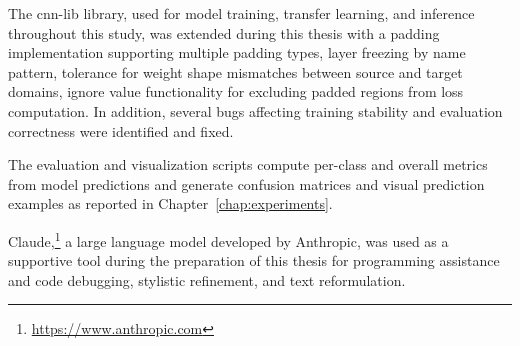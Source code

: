 The cnn-lib library, used for model training, transfer learning, and inference throughout this study, was extended during this thesis with a padding implementation supporting multiple padding types, layer freezing by name pattern, tolerance for weight shape mismatches between source and target domains, ignore value functionality for excluding padded regions from loss computation. In addition, several bugs affecting training stability and evaluation correctness were identified and fixed.

The evaluation and visualization scripts compute per-class and overall metrics from model predictions and generate confusion matrices and visual prediction examples as reported in Chapter~\ref{chap:experiments}.

Claude,\footnote{\url{https://www.anthropic.com}} a large language model developed by Anthropic, was used as a supportive tool during the preparation of this thesis for programming assistance and code debugging, stylistic refinement, and text reformulation.